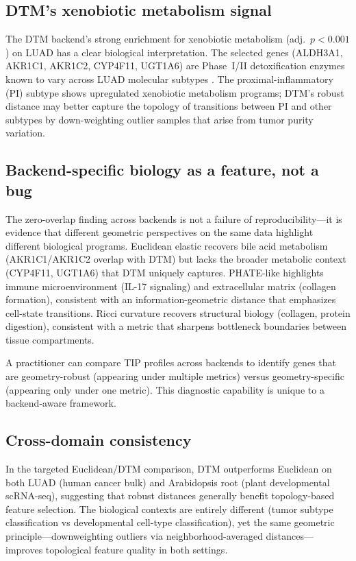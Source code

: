 \documentclass[11pt]{article}
\begin{document}
\subsection{DTM's xenobiotic metabolism signal}

The DTM backend's strong enrichment for xenobiotic metabolism (adj.\ $p < 0.001$) on LUAD has a clear biological interpretation.
The selected genes (ALDH3A1, AKR1C1, AKR1C2, CYP4F11, UGT1A6) are Phase~I/II detoxification enzymes known to vary across LUAD molecular subtypes \cite{rizvi2017}.
The proximal-inflammatory (PI) subtype shows upregulated xenobiotic metabolism programs; DTM's robust distance may better capture the topology of transitions between PI and other subtypes by down-weighting outlier samples that arise from tumor purity variation.

\subsection{Backend-specific biology as a feature, not a bug}

The zero-overlap finding across backends is not a failure of reproducibility---it is evidence that different geometric perspectives on the same data highlight different biological programs.
Euclidean elastic recovers bile acid metabolism (AKR1C1/AKR1C2 overlap with DTM) but lacks the broader metabolic context (CYP4F11, UGT1A6) that DTM uniquely captures.
PHATE-like highlights immune microenvironment (IL-17 signaling) and extracellular matrix (collagen formation), consistent with an information-geometric distance that emphasizes cell-state transitions.
Ricci curvature recovers structural biology (collagen, protein digestion), consistent with a metric that sharpens bottleneck boundaries between tissue compartments.

A practitioner can compare TIP profiles across backends to identify genes that are geometry-robust (appearing under multiple metrics) versus geometry-specific (appearing only under one metric).
This diagnostic capability is unique to a backend-aware framework.

\subsection{Cross-domain consistency}

In the targeted Euclidean/DTM comparison, DTM outperforms Euclidean on both LUAD (human cancer bulk) and Arabidopsis root (plant developmental scRNA-seq), suggesting that robust distances generally benefit topology-based feature selection.
The biological contexts are entirely different (tumor subtype classification vs developmental cell-type classification), yet the same geometric principle---downweighting outliers via neighborhood-averaged distances---improves topological feature quality in both settings.
\end{document}
